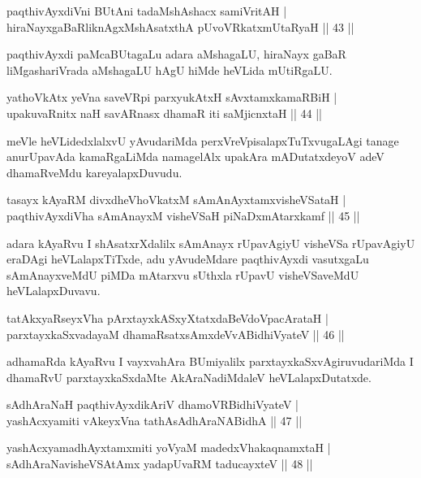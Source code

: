 \begin{shl}
paqthivAyxdiVni BUtAni tadaMshAshacx samiVritAH |\\
hiraNayxgaBaRliknAgxMshAsatxthA pUvoVRkatxmUtaRyaH \hfill || 43 ||
\end{shl}

\begin{artha}
paqthivAyxdi paMcaBUtagaLu adara aMshagaLU, hiraNayx gaBaR liMgashariVrada aMshagaLU hAgU hiMde heVLida mUtiRgaLU.
\end{artha}

\begin{shl}
yathoVkAtx yeVna saveVR\s pi parxyukAtxH sAvxtamxkamaRBiH |\\
upakuvaRnitx naH savARnasx dhamaR iti saMjicnxtaH \hfill || 44 ||
\end{shl}

\begin{artha}
meVle heVLidedxlalxvU yAvudariMda perxVreVpisalapxTuTxvugaLAgi tanage anurUpavAda kamaRgaLiMda namagelAlx upakAra mADutatxdeyoV adeV dhamaRveMdu kareyalapxDuvudu.
\end{artha}

\begin{shl}
tasayx kAyaRM divxdheVhoVkatxM sAmAnAyxtamxvisheVSataH |\\
paqthivAyxdiVha sAmAnayxM visheVSaH piNaDxmAtarxkamf \hfill || 45 ||
\end{shl}

\begin{artha}
adara kAyaRvu I shAsatxrXdalilx sAmAnayx rUpavAgiyU visheVSa rUpavAgiyU eraDAgi heVLalapxTiTxde, adu yAvudeMdare paqthivAyxdi vasutxgaLu sAmAnayxveMdU piMDa mAtarxvu sUthxla rUpavU visheVSaveMdU heVLalapxDuvavu.
\end{artha}

\begin{shl}
tatAkxyaRseyxVha pArxtayxkASxyXtatxdaBeVdoVpacArataH |\\
parxtayxkaSxvadayaM dhamaRsatxsAmxdeVvABidhiVyateV \hfill || 46 ||
\end{shl}

\begin{artha}
adhamaRda kAyaRvu I vayxvahAra BUmiyalilx parxtayxkaSxvAgiruvudariMda I dhamaRvU parxtayxkaSxdaMte AkAraNadiMdaleV heVLalapxDutatxde.
\end{artha}

\begin{shl}
sAdhAraNaH paqthivAyxdikAriV dhamoVR\s BidhiVyateV |\\
yashAcxyamiti vAkeyxVna tathA\s sAdhAraNABidhA \hfill || 47 ||
\end{shl}
\begin{shl}
yashAcxyamadhAyxtamxmiti yoV\s yaM madedxVhakaqnamxtaH |\\
sAdhAraNavisheVSAtAmx yadapUvaRM taducayxteV \hfill || 48 ||
\end{shl}

